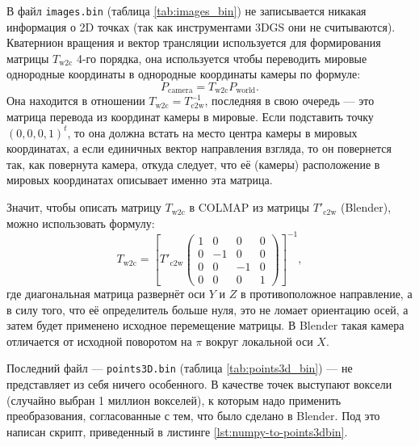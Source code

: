В файл \texttt{images.bin} (таблица \ref{tab:images_bin}) не записывается никакая информация о 2D точках (так как инструментами 3DGS они не считываются). Кватернион вращения и вектор трансляции используется для формирования матрицы $T_\text{w2c}$ 4-го порядка, она используется чтобы переводить мировые однородные координаты в однородные координаты камеры по формуле:
%
\[
	P_\text{camera} = T_\text{w2c} P_\text{world}.
\]
%
Она находится в отношении $T_\text{w2c} = T^{-1}_\text{c2w}$, последняя в свою очередь --- это матрица перевода из координат камеры в мировые. Если подставить точку $(0, 0, 0, 1)^t$, то она должна встать на место центра камеры в мировых координатах, а если единичных вектор направления взгляда, то он повернется так, как повернута камера, откуда следует, что её (камеры) расположение в мировых координатах описывает именно эта матрица.

Значит, чтобы описать матрицу $T_\text{w2c}$ в COLMAP из матрицы $T'_\text{c2w}$ (Blender), можно использовать формулу:
%
\[
	T_\text{w2c} = \left[
		T'_\text{c2w}
		\begin{pmatrix}
			1 & 0 & 0 & 0 \\
			0 & -1 & 0 & 0 \\
			0 & 0 & -1 & 0 \\
			0 & 0 & 0 & 1
		\end{pmatrix}
	\right]^{-1},
\]
%
где диагональная матрица развернёт оси $Y$ и $Z$ в противоположное направление, а в силу того, что её определитель больше нуля, это не ломает ориентацию осей, а затем будет применено исходное перемещение матрицы. В Blender такая камера отличается от исходной поворотом на $\pi$ вокруг локальной оси $X$.

Последний файл --- \texttt{points3D.bin} (таблица \ref{tab:points3d_bin}) --- не представляет из себя ничего особенного. В качестве точек выступают воксели (случайно выбран 1 миллион вокселей), к которым надо применить преобразования, согласованные с тем, что было сделано в Blender. Под это написан скрипт, приведенный в листинге \ref{lst:numpy-to-points3dbin}.